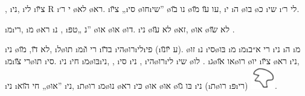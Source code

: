 ,  \i{ני}, \i{לי}  \i{צ}\u{יו} {R} \i{י} ר׳ \o{לא} \o{רא}. \i{צ}\u{יו}  „\i{סי} \o{חו}\i{שי}” \o{נו} \u{בו} \o{עו} \u{עו} \u{מו},  \i{י} \i{ה} \o{בו} \o{כ}  \i{שי}   \i{לי} ר׳.

\i{מ}\i{רי}, \i{מ} \o{רא} \i{נ}  , \i{נ}  „טפּ” \o{או} \o{או} \o{דו}.  \i{ני} \o{לא} \u{עו} \o{זא}, \o{או}  \o{לא}  \u{שו} .

\i{ני} \o{לא} \u{דו}, \u{מו},  \i{ל}\o{תו} \i{מ}\i{רי} \u{ו} \i{ב}\u{דו}  \i{הי}\o{רו}\i{לי}\i{פי} (\i{ע}  \u{יו}\u{נו}). \o{זו} \i{נ}  \i{סי}\o{בּו}  \i{מ}  \i{מ}\i{רי} א״ב \i{ני} \i{ה}  \i{מ} \i{מ}\i{רי}  \u{צו}\o{תו}  \i{סי}. \i{ני} \i{חי}  \i{מ}\o{בּו}\i{ני}, , \i{סי} \i{ני} ,  \i{הי}\o{רו}\i{לי} \i{שי} \o{לו} . \i{ג}\o{או} \u{או}\o{רו} \o{יו}  \i{צ}\u{יו} \o{רא} \i{ני}, \i{ני} \i{חי} \u{הוא}    „\o{או}” \i{ני},  \i{ת}\o{רו} \i{מ}\o{נו}  \o{רא} \i{כּי} \o{או}  \o{או} \o{בּו} \u{גו} \i{ני}    (\i{ת}\o{רו} \i{פּ}\i{רי}) \includegraphics[height=2ex]{texts/images/goldwasser-sinaj-pitrija.jpg}.

